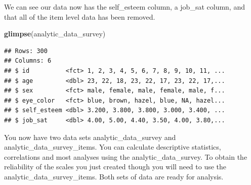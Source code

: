 \documentclass[
]{krantz}
\makeatletter
\newenvironment{Shaded}{\begin{snugshade}}{\end{snugshade}}
\newcommand{\DataTypeTok}[1]{\textcolor[rgb]{0.27,0.27,0.27}{#1}}
\newcommand{\KeywordTok}[1]{\textcolor[rgb]{0.27,0.27,0.27}{\textbf{#1}}}
\newcommand{\NormalTok}[1]{#1}
\newcommand{\OperatorTok}[1]{\textcolor[rgb]{0.43,0.43,0.43}{\textbf{#1}}}
\newcommand{\OtherTok}[1]{\textcolor[rgb]{0.37,0.37,0.37}{#1}}
\newcommand{\StringTok}[1]{\textcolor[rgb]{0.5,0.5,0.5}{#1}}
\newenvironment{kframe}{%
\medskip{}
\setlength{\fboxsep}{.8em}
 \def\at@end@of@kframe{}%
 \ifinner\ifhmode%
  \def\at@end@of@kframe{\end{minipage}}%
  \begin{minipage}{\columnwidth}%
 \fi\fi%
 \def\FrameCommand##1{\hskip\@totalleftmargin \hskip-\fboxsep
 \colorbox{shadecolor}{##1}\hskip-\fboxsep
     \hskip-\linewidth \hskip-\@totalleftmargin \hskip\columnwidth}%
 \MakeFramed {\advance\hsize-\width
   \@totalleftmargin\z@ \linewidth\hsize
   \@setminipage}}%
 {\par\unskip\endMakeFramed%
 \at@end@of@kframe}
\renewenvironment{Shaded}{\begin{kframe}}{\end{kframe}}
\makeatother
\begin{document}
\begin{Shaded}
\end{Shaded}

We can see our data now has the self\_esteem column, a job\_sat column, and that all of the item level data has been removed.

\begin{Shaded}
\begin{Highlighting}[]
\KeywordTok{glimpse}\NormalTok{(analytic_data_survey)}
\end{Highlighting}
\end{Shaded}

\begin{verbatim}
## Rows: 300
## Columns: 6
## $ id          <fct> 1, 2, 3, 4, 5, 6, 7, 8, 9, 10, 11, ...
## $ age         <dbl> 23, 22, 18, 23, 22, 17, 23, 22, 17,...
## $ sex         <fct> male, female, male, female, male, f...
## $ eye_color   <fct> blue, brown, hazel, blue, NA, hazel...
## $ self_esteem <dbl> 3.200, 3.800, 3.800, 3.000, 3.400, ...
## $ job_sat     <dbl> 4.00, 5.00, 4.40, 3.50, 4.00, 3.80,...
\end{verbatim}

You now have two data sets analytic\_data\_survey and analytic\_data\_survey\_items. You can calculate descriptive statistics, correlations and most analyses using the analytic\_data\_survey. To obtain the reliability of the scales you just created though you will need to use the analytic\_data\_survey\_items. Both sets of data are ready for analysis.
\end{document}
